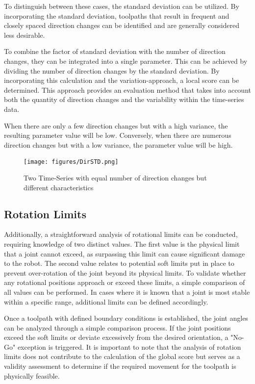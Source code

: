 To distinguish between these cases, the standard deviation can be utilized. By incorporating the standard deviation, toolpaths that result in frequent and closely spaced direction changes can be identified and are generally considered less desirable.

To combine the factor of standard deviation with the number of direction changes, they can be integrated into a single parameter. This can be achieved by dividing the number of direction changes by the standard deviation. By incorporating this calculation and the variation-approach, a local score can be determined. This approach provides an evaluation method that takes into account both the quantity of direction changes and the variability within the time-series data.

When there are only a few direction changes but with a high variance, the resulting parameter value will be low. Conversely, when there are numerous direction changes but with a low variance, the parameter value will be high.


\begin{figure}[H]
	\centerline{\texttt{[image: figures/DirSTD.png]}}
	\caption{Two Time-Series with equal number of direction changes but different characteristics}
	\label{dirchangeSTD}
\end{figure}
\newpage
\subsection{Rotation Limits}\label{RotLim}
Additionally, a straightforward analysis of rotational limits can be conducted, requiring knowledge of two distinct values. The first value is the physical limit that a joint cannot exceed, as surpassing this limit can cause significant damage to the robot. The second value relates to potential soft limits put in place to prevent over-rotation of the joint beyond its physical limits. To validate whether any rotational positions approach or exceed these limits, a simple comparison of all values can be performed. In cases where it is known that a joint is most stable within a specific range, additional limits can be defined accordingly.

Once a toolpath with defined boundary conditions is established, the joint angles can be analyzed through a simple comparison process. If the joint positions exceed the soft limits or deviate excessively from the desired orientation, a "No-Go" exception is triggered. It is important to note that the analysis of rotation limits does not contribute to the calculation of the global score but serves as a validity assessment to determine if the required movement for the toolpath is physically feasible.

